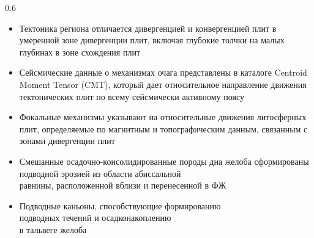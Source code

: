 \documentclass[pdflatex,compress,8pt,
	xcolor={dvipsnames,dvipsnames,svgnames,x11names,table},
	hyperref={colorlinks = true,breaklinks = true, urlcolor = NavyBlue}]{beamer}
\begin{document}
\begin{frame}
\begin{minipage}[0.4\textheight]{\textwidth}
\begin{columns}[T]
\begin{column}{0.6\textwidth}
\begin{itemize}
            \item Тектоника региона отличается дивергенцией и конвергенцией плит в умеренной зоне дивергенции плит, включая глубокие толчки на малых глубинах в зоне схождения плит
            \item Сейсмические данные о механизмах очага представлены в каталоге Centroid Moment Tensor (CMT), который дает относительное направление движения тектонических плит по всему сейсмически активному поясу
            \item Фокальные механизмы указывают на относительные движения литосферных плит, определяемые по магнитным и топографическим данным, связанным с зонами дивергенции плит
            \item Смешанные осадочно-консолидированные породы дна желоба сформированы подводной эрозией из области абиссальной\\ равнины, расположенной вблизи и перенесенной в ФЖ
            \item Подводные каньоны, способствующие формированию \\подводных течений и осадконакоплению \\в тальвеге желоба
\end{itemize}

\end{column}
\end{columns}
\end{minipage}
\end{frame}

\end{document}
